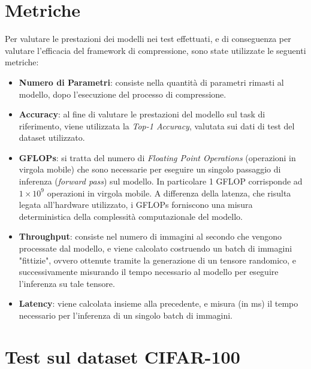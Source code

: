 \section{Metriche}
Per valutare le prestazioni dei modelli nei test effettuati, e di conseguenza per valutare l'efficacia del framework di compressione, sono state utilizzate le seguenti metriche:
\begin{itemize}
    \item \textbf{Numero di Parametri}: consiste nella quantità di parametri rimasti al modello, dopo l'esecuzione del processo di compressione.
    \item \textbf{Accuracy}: al fine di valutare le prestazioni del modello sul task di riferimento, viene utilizzata la \textit{Top-1 Accuracy}, valutata sui dati di test del dataset utilizzato.
    \item \textbf{GFLOPs}: si tratta del numero di \textit{Floating Point Operations} (operazioni in virgola mobile) che sono necessarie per eseguire un singolo passaggio di inferenza (\textit{forward pass}) sul modello. In particolare 1 GFLOP corrisponde ad $1 \times 10^9$ operazioni in virgola mobile. A differenza della latenza, che risulta legata all'hardware utilizzato, i GFLOPs forniscono una misura deterministica della complessità computazionale del modello.
    \item \textbf{Throughput}: consiste nel numero di immagini al secondo che vengono processate dal modello, e viene calcolato costruendo un batch di immagini "fittizie", ovvero ottenute tramite la generazione di un tensore randomico, e successivamente misurando il tempo necessario al modello per eseguire l'inferenza su tale tensore.
    \item \textbf{Latency}: viene calcolata insieme alla precedente, e misura (in ms) il tempo necessario per l'inferenza di un singolo batch di immagini.  
\end{itemize}


\section{Test sul dataset CIFAR-100}
\label{section:test}
